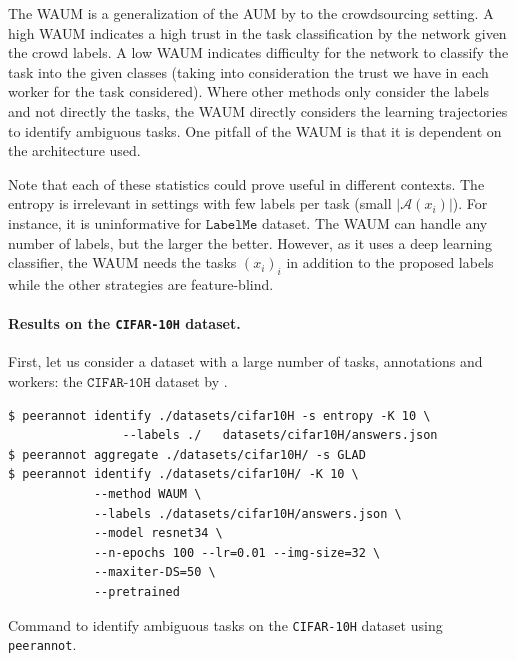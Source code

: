 The WAUM is a generalization of the AUM by \citet{pleiss_identifying_2020} to the crowdsourcing setting. A high WAUM indicates a high trust in the task classification by the network given the crowd labels. A low WAUM indicates difficulty for the network to classify the task into the given classes (taking into consideration the trust we have in each worker for the task considered). Where other methods only consider the labels and not directly the tasks, the WAUM directly considers the learning trajectories to identify ambiguous tasks. One pitfall of the WAUM is that it is dependent on the architecture used.

Note that each of these statistics could prove useful in different contexts.
The entropy is irrelevant in settings with few labels per task (small $|\mathcal{A}(x_i)|$). For instance, it is uninformative for $\texttt{LabelMe}$ dataset.
The WAUM can handle any number of labels, but the larger the better. However, as it uses a deep learning classifier, the WAUM needs the tasks $(x_i)_i$ in addition to the proposed labels while the other strategies are feature-blind.

\paragraph{Results on the \texttt{CIFAR-10H} dataset.}

First, let us consider a dataset with a large number of tasks, annotations and workers: the $\texttt{CIFAR-10H}$ dataset by \citet{peterson_human_2019}.

\begin{listing}[H]
    \begin{verbatim}
$ peerannot identify ./datasets/cifar10H -s entropy -K 10 \
                --labels ./   datasets/cifar10H/answers.json
$ peerannot aggregate ./datasets/cifar10H/ -s GLAD
$ peerannot identify ./datasets/cifar10H/ -K 10 \
            --method WAUM \
            --labels ./datasets/cifar10H/answers.json \
            --model resnet34 \
            --n-epochs 100 --lr=0.01 --img-size=32 \
            --maxiter-DS=50 \
            --pretrained

    \end{verbatim}
\caption{Command to identify ambiguous tasks on the \texttt{CIFAR-10H} dataset using \texttt{peerannot}.}
\label{lst:peeranot_identify_c10h}
\end{listing}

